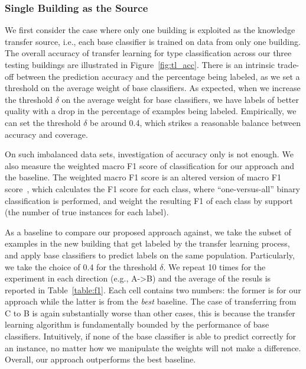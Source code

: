 \subsubsection{Single Building as the Source}
We first consider the case where only one building is exploited as the knowledge transfer source, i.e., each base classifier is trained on data from only one building. 
The overall accuracy of transfer learning for type classification across our three testing buildings are illustrated in Figure~\ref{fig:tl_acc}.
There is an intrinsic trade-off between the prediction accuracy and the percentage being labeled, as we set a threshold on the average weight of base classifiers. 
As expected, when we increase the threshold $\delta$ on the average weight for base classifiers, we have labels of better quality with a drop in the percentage of examples being labeled. 
Empirically, we can set the threshold $\delta$ be around 0.4, which strikes a reasonable balance between accuracy and coverage.

On such imbalanced data sets, investigation of accuracy only is not enough. We also measure the weighted macro F1 score of classification for our approach and the baseline. The weighted macro F1 score is an altered version of macro F1 score~\cite{yang}, which calculates the F1 score for each class, where ``one-versus-all'' binary classification is performed, and weight the resulting F1 of each class by support (the number of true instances for each label). 

As a baseline to compare our proposed approach against, we take the subset of examples in the new building that get labeled by the transfer learning process, and apply base classifiers to predict labels on the same population. 
Particularly, we take the choice of 0.4 for the threshold $\delta$. 
We repeat 10 times for the experiment in each direction (e.g., A->B) and the average of the resuls is reported in Table~\ref{table:f1}. 
Each cell contains two numbers: the former is for our approach while the latter is from the {\it best} baseline.
The case of transferring from C to B is again substantially worse than other cases, this is because the transfer learning algorithm is fundamentally bounded by the performance of base classifiers. Intuitively, if none of the base classifier is able to predict correctly for an instance, no matter how we manipulate the weights will not make a difference.
Overall, our approach outperforms the best baseline.


